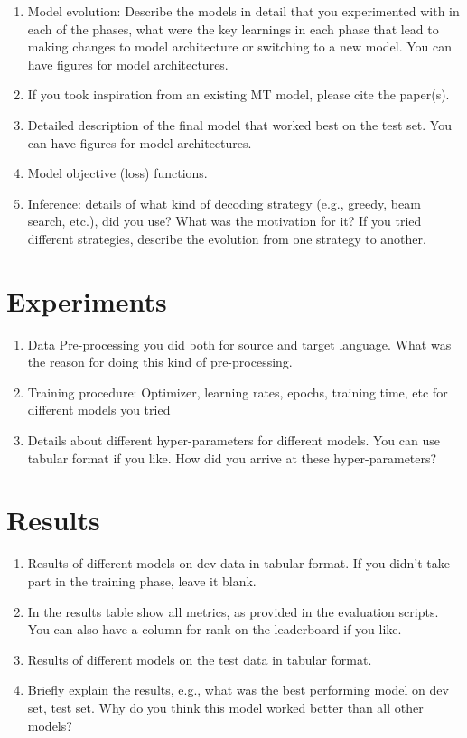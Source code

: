 \documentclass[11pt, oneside]{article}   	%
\begin{document}
 \begin{enumerate}
\item Model evolution: Describe the models in detail that you experimented with in each of the phases, what were the key learnings in each phase that lead to making changes to model architecture or switching to a new model. You can have figures for model architectures. 
\item If you took inspiration from an existing MT model, please cite the paper(s).
\item Detailed description of the final model that worked best on the test set. You can have figures for model architectures.  
\item Model objective (loss) functions. 
\item Inference: details of what kind of decoding strategy (e.g., greedy, beam search, etc.), did you use? What was the motivation for it? If you tried different strategies, describe the evolution from one strategy to another. 
\end{enumerate}



\section{Experiments}

\begin{enumerate}
\item Data Pre-processing you did both for source and target language. What was the reason for doing this kind of pre-processing. 
\item Training procedure: Optimizer, learning rates, epochs, training time, etc for different models you tried
\item Details about different hyper-parameters for different models. You can use tabular format if you like. How did you arrive at these hyper-parameters? 
\end{enumerate}


\section{Results}

\begin{enumerate}
\item Results of different models on dev data in tabular format. If you didn't take part in the training phase, leave it blank. \item In the results table show all metrics, as provided in the evaluation scripts. You can also have a column for rank on the leaderboard if you like. 
\item Results of different models on the test data in tabular format. 
\item Briefly explain the results, e.g., what was the best performing model on dev set, test set. Why do you think this model worked better than all other models?
\end{enumerate}
\end{document}
